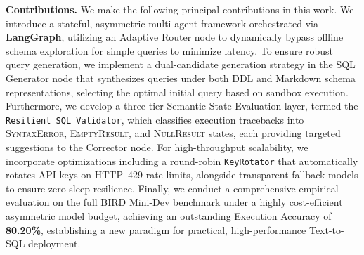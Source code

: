 \medskip
\noindent\textbf{Contributions.} We make the following principal contributions in this work. We introduce a stateful, asymmetric multi-agent framework orchestrated via \textbf{LangGraph}, utilizing an Adaptive Router node to dynamically bypass offline schema exploration for simple queries to minimize latency. To ensure robust query generation, we implement a dual-candidate generation strategy in the SQL Generator node that synthesizes queries under both DDL and Markdown schema representations, selecting the optimal initial query based on sandbox execution. Furthermore, we develop a three-tier Semantic State Evaluation layer, termed the \texttt{Resilient SQL Validator}, which classifies execution tracebacks into \textsc{SyntaxError}, \textsc{EmptyResult}, and \textsc{NullResult} states, each providing targeted suggestions to the Corrector node. For high-throughput scalability, we incorporate optimizations including a round-robin \texttt{KeyRotator} that automatically rotates API keys on HTTP~429 rate limits, alongside transparent fallback models to ensure zero-sleep resilience. Finally, we conduct a comprehensive empirical evaluation on the full BIRD Mini-Dev benchmark under a highly cost-efficient asymmetric model budget, achieving an outstanding Execution Accuracy of \textbf{80.20\%}, establishing a new paradigm for practical, high-performance Text-to-SQL deployment.

